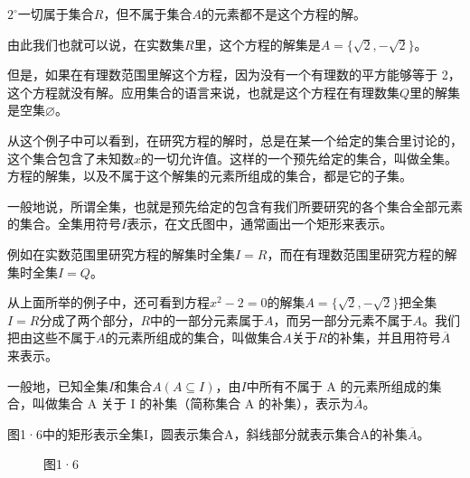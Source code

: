 \(2^{\circ}\)一切属于集合\(R\)，但不属于集合\(A\)的元素都不是这个方程的解。

由此我们也就可以说，在实数集\(R\)里，这个方程的解集是\(A = \{\sqrt{2}, -\sqrt{2}\}\)。

但是，如果在有理数范围里解这个方程，因为没有一个有理数的平方能够等于
2，这个方程就没有解。应用集合的语言来说，也就是这个方程在有理数集\(Q\)里的解集是空集\(\varnothing\)。

从这个例子中可以看到，在研究方程的解时，总是在某一个给定的集合里讨论的，这个集合包含了未知数\(x\)的一切允许值。这样的一个预先给定的集合，叫做全集。方程的解集，以及不属于这个解集的元素所组成的集合，都是它的子集。

一般地说，所谓全集，也就是预先给定的包含有我们所要研究的各个集合全部元素的集合。全集用符号\(I\)表示，在文氏图中，通常画出一个矩形来表示。

例如在实数范围里研究方程的解集时全集\(I = R\)，而在有理数范围里研究方程的解集时全集\(I = Q\)。

从上面所举的例子中，还可看到方程\(x^{2} - 2 = 0\)的解集\(A = \{\sqrt{2}, -\sqrt{2}\}\)把全集\(I = R\)分成了两个部分，\(R\)中的一部分元素属于\(A\)，而另一部分元素不属于\(A\)。我们把由这些不属于\(A\)的元素所组成的集合，叫做集合\(A\)关于\(R\)的补集，并且用符号\(\overline{A}\)来表示。

一般地，已知全集\(I\)和集合\(A(A \subseteq I)\)，由\(I\)中所有不属于 A
的元素所组成的集合，叫做集合 A 关于 I 的补集（简称集合 A
的补集），表示为\(\overline{A}\)。

图1·6中的矩形表示全集I，圆表示集合A，斜线部分就表示集合A的补集\(\overline{A}\)。

\begin{figure}
\centering
\caption{图1·6}
\end{figure}


